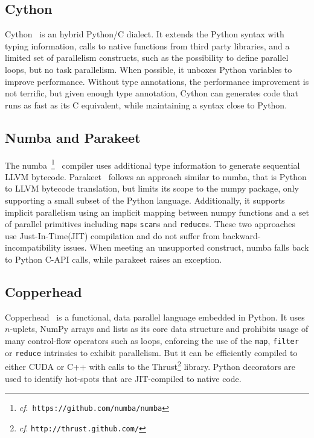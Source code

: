 \documentclass[10pt, preprint]{sigplanconf}
\begin{document}

\subsection{Cython}
\cite{cython2010}

%
Cython~\cite{cython2010} is an hybrid Python/C dialect. It extends the Python
syntax with typing information, calls to native functions from third party
libraries, and a limited set of parallelism constructs, such as the possibility
to define parallel loops, but no task parallelism. When possible, it unboxes
Python variables to improve performance. Without type annotations, the
performance improvement is not terrific, but given enough type annotation,
Cython can generates code that runs as fast as its C equivalent, while
maintaining a syntax close to Python.


\subsection{Numba and Parakeet}


The numba~\footnote{\emph{cf}.\ \texttt{https://github.com/numba/numba}}~\cite{numba}
compiler uses additional type information to generate sequential LLVM bytecode.
Parakeet~\cite{parakeet2012} follows an approach similar to numba, that is
Python to LLVM bytecode translation, but limits its scope to the numpy package,
only supporting a small subset of the Python language. Additionally, it supports
implicit parallelism using an implicit mapping between numpy functions and a set
of parallel primitives including \texttt{map}s \texttt{scan}s and
\texttt{reduce}s. These two approaches use Just-In-Time(JIT) compilation and do
not suffer from backward-incompatibility issues. When meeting an unsupported
construct, numba falls back to Python C-API calls, while parakeet raises an
exception.



\subsection{Copperhead}
\cite{copperhead2011}

Copperhead~\cite{copperhead2011} is a functional, data parallel language
embedded in Python. It uses $n$-uplets, NumPy arrays and lists as its core data
structure and prohibits usage of many control-flow operators such as loops,
enforcing the use of the \texttt{map}, \texttt{filter} or \texttt{reduce}
intrinsics to exhibit parallelism. But it can be efficiently compiled to either
CUDA or C++ with calls to the Thrust\footnote{\emph{cf}.
\texttt{http://thrust.github.com/}} library. Python decorators are used to
identify hot-spots that are JIT-compiled to native code.
\end{document}
